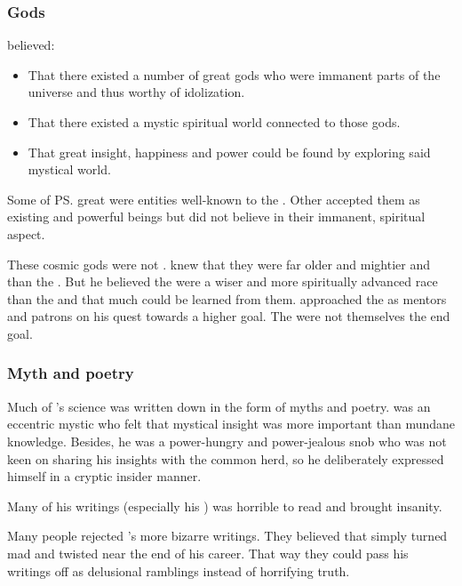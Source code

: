\subsubsection{Gods}
\Sethicus believed:
\begin{itemize}
  \item 
    That there existed a number of great gods who were immanent parts of the universe and thus worthy of idolization.
  \item 
    That there existed a mystic spiritual world connected to those gods.
  \item
    That great insight, happiness and power could be found by exploring said mystical world.
\end{itemize}

Some of \ps{\Sethicus} great  were entities well-known to the \ophidians.
Other \ophidians accepted them as existing and powerful beings but did not believe in their immanent, spiritual aspect. 

These cosmic gods were not \xss. 
\Sethicus knew that they were far older and mightier and  than the \xss. 
But he believed the \xss were a wiser and more spiritually advanced race than the \ophidians and that much could be learned from them. 
\Sethicus approached the \xss as mentors and patrons on his quest towards a higher goal. 
The \xss were not themselves the end goal. 





\subsubsection{Myth and poetry}
Much of \Sethicus's science was written down in the form of myths and poetry. 
\Sethicus was an eccentric mystic who felt that mystical insight was more important than mundane knowledge. 
Besides, he was a power-hungry and power-jealous snob who was not keen on sharing his insights with the common herd, so he deliberately expressed himself in a cryptic insider manner. 

Many of his writings (especially his ) was horrible to read and brought insanity. 

Many people rejected \Sethicus's more bizarre writings. 
They believed that \Sethicus simply turned mad and twisted near the end of his career.
That way they could pass his writings off as delusional ramblings instead of horrifying truth. 





